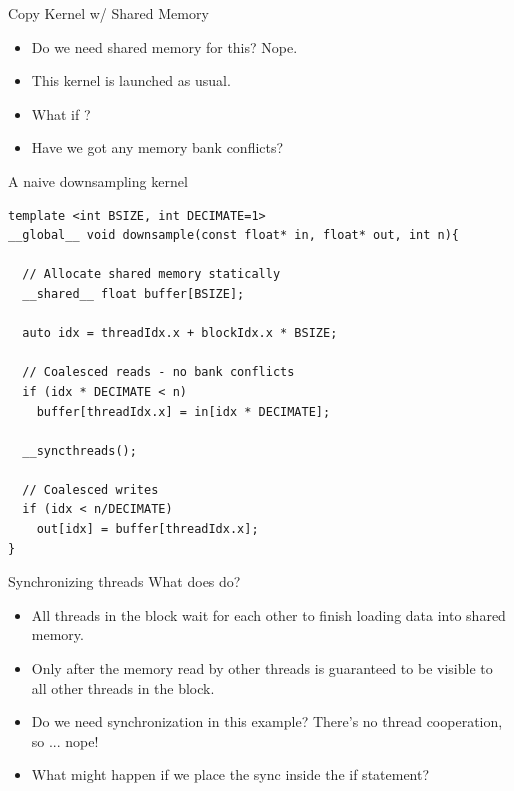 \documentclass[aspectratio=43]{beamer}
\begin{document}
\begin{frame}[fragile]{Copy Kernel w/ Shared Memory}
    \begin{itemize}
        \item Do we need shared memory for this? Nope.
        \item This kernel is launched as usual.
        \item What if ?
        \item Have we got any memory bank conflicts?
    \end{itemize}

    \begin{code}{A naive downsampling kernel}
        \begin{lstlisting}[style=boxcudatiny]
template <int BSIZE, int DECIMATE=1>
__global__ void downsample(const float* in, float* out, int n){

  // Allocate shared memory statically
  __shared__ float buffer[BSIZE];

  auto idx = threadIdx.x + blockIdx.x * BSIZE;

  // Coalesced reads - no bank conflicts
  if (idx * DECIMATE < n)
    buffer[threadIdx.x] = in[idx * DECIMATE];

  __syncthreads();

  // Coalesced writes
  if (idx < n/DECIMATE)
    out[idx] = buffer[threadIdx.x];
}
        \end{lstlisting}
    \end{code}

\end{frame}

\begin{frame}[fragile]{Synchronizing threads}
    What does  do?
    
    \begin{itemize}
        \item All threads in the block wait for each other to finish loading data into shared memory.
        \item Only after  the memory read by other threads is guaranteed to be visible to all other threads in the block.
        \item Do we need synchronization in this example? There's no thread cooperation, so ... nope!
        \item What might happen if we place the sync inside the if statement?
        
    \end{itemize}
\end{frame}
\end{document}
